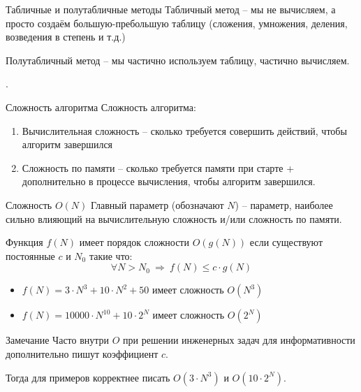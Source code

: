 \begin{frame}{Табличные и полутабличные методы}
	Табличный метод -- мы не вычисляем, а просто создаём большую-пребольшую таблицу (сложения, умножения, деления, возведения в степень и т.д.)
	
	
	Полутабличный метод -- мы частично используем таблицу, частично вычисляем.
	
	.
\end{frame}


\begin{frame}{Сложность алгоритма}
	Сложность алгоритма:
	\begin{enumerate}
		\item Вычислительная сложность -- сколько требуется совершить действий, чтобы алгоритм завершился
		\item Сложность по памяти -- сколько требуется памяти при старте + дополнительно в процессе вычисления, чтобы алгоритм завершился.
	\end{enumerate}
	
	

\end{frame}



\begin{frame}{Сложность $O(N)$}
	\footnotesize
	{Главный параметр} (обозначают $N$) -- параметр, наиболее сильно влияющий на вычислительную сложность 
	и/или сложность по памяти.
	
	
	Функция $f(N)$ имеет порядок сложности $O(g(N))$ 
	если существуют постоянные $c$ и $N_0$ такие что:
	\begin{equation}
	\forall N > N_0  ~\Longrightarrow~ f(N)  \leqslant c \cdot g(N)
	\end{equation}
	
	\begin{itemize}
		\item $f(N)=3 \cdot N^3 + 10 \cdot N^2 + 50$ имеет сложность $O(N^3)$
		\item $f(N)=10000 \cdot N^{10} + 10 \cdot 2^N$ имеет сложность $O(2^N)$
	\end{itemize}

	\begin{block}{Замечание}
		Часто внутри $O$ при решении инженерных задач
		для информативности дополнительно пишут коэффициент $c$.
		
		Тогда для примеров корректнее писать $O(3 \cdot N^3)$ и $O(10 \cdot 2^N)$.
	\end{block}
	
\end{frame}

